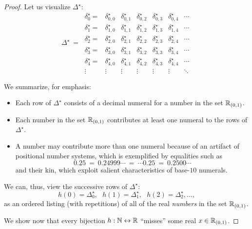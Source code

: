 \begin{proof}
\bigskip

\noindent Let us visualize $\Delta^\star$:
\[ \Delta^\star \ = \
\begin{array}{ccccccc}
\delta^\star_0 = &
\delta^\star_{0,0} & \delta^\star_{0,1} & \delta^\star_{0,2} & \delta^\star_{0,3} &
	\delta^\star_{0,4} & \cdots \\
\delta^\star_1 = &
\delta^\star_{1,0} & \delta^\star_{1,1} & \delta^\star_{1,2} & \delta^\star_{1,3} &
	\delta^\star_{1,4} & \cdots \\
\delta^\star_2 = &
\delta^\star_{2,0} & \delta^\star_{2,1} & \delta^\star_{2,2} & \delta^\star_{2,3} &
	\delta^\star_{2,4} & \cdots \\
\delta^\star_3 = &
\delta^\star_{3,0} & \delta^\star_{3,1} & \delta^\star_{3,2} & \delta^\star_{3,3} &
	\delta^\star_{3,4} & \cdots \\ 
\delta^\star_4 = &
\delta^\star_{4,0} & \delta^\star_{4,1} & \delta^\star_{4,2} & \delta^\star_{4,3} &
	\delta^\star_{4,4} & \cdots \\ 
\vdots &
\vdots  & \vdots  & \vdots  & \vdots  & \vdots  & \ddots
\end{array}
\]

\noindent We summarize, for emphasis:
\begin{itemize}
\item
Each row of $\Delta^\star$ consists of a decimal numeral for a number in the set $\mathbb{R}_{(0,1)}$.

\item
Each number in the set $\mathbb{R}_{(0,1)}$ contributes at least one numeral to the rows of $\Delta^\star$.

\item
A number may contribute more than one numeral because of an artifact of positional number systems, which is exemplified by equalities such as
\[
0.25 \ = \ 0.24999\cdots \ = \  \cdots 0.25 \ = \ 0.2500 \cdots
\]
and their kin, which exploit salient characteristics of base-$10$ numerals.
\end{itemize}
We can, thus, view the successive rows of $\Delta^\star$: 
\[ h(0) = \Delta^\star_0, \ \ \ h(1) = \Delta^\star_1,  \ \ \ h(2) = \Delta^\star_2, \ldots, \]
as an ordered listing (with repetitions) of all of the real {\em numbers} in the set $\mathbb{R}_{(0,1)}$.

\medskip

We show now that every bijection $h: \mathbb{N} \leftrightarrow \mathbb{R}$ ``misses'' some real $x \in \mathbb{R}_{(0,1)}$.

\smallskip


\end{proof}
